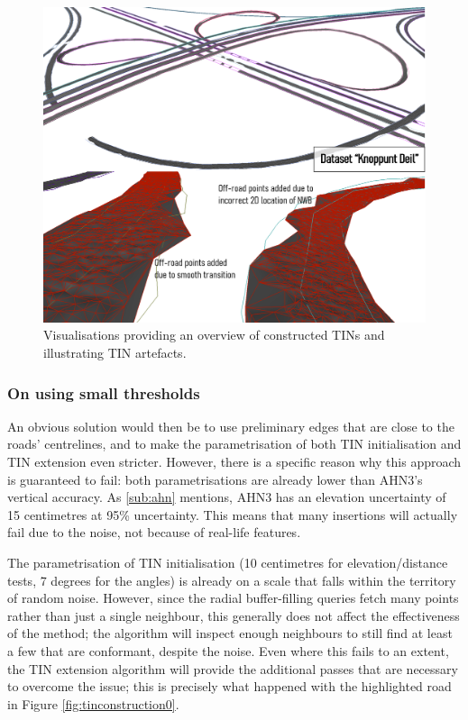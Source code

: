 \begin{figure}
    \centering
    \includegraphics[width=0.9\linewidth]{final_report/figs/tinconstruction1.png}
    \caption{Visualisations providing an overview of constructed TINs and illustrating TIN artefacts.}
    \label{fig:tinconstruction1}
\end{figure}

\subsubsection{On using small thresholds}

An obvious solution would then be to use preliminary edges that are close to the roads' centrelines, and to make the parametrisation of both TIN initialisation and TIN extension even stricter. However, there is a specific reason why this approach is guaranteed to fail: both parametrisations are already lower than AHN3's vertical accuracy. As \ref{sub:ahn} mentions, AHN3 has an elevation uncertainty of 15 centimetres at 95\% uncertainty. This means that many insertions will actually fail due to the noise, not because of real-life features.

The parametrisation of TIN initialisation (10 centimetres for elevation/distance tests, 7 degrees for the angles) is already on a scale that falls within the territory of random noise. However, since the radial buffer-filling queries fetch many points rather than just a single neighbour, this generally does not affect the effectiveness of the method; the algorithm will inspect enough neighbours to still find at least a few that are conformant, despite the noise. Even where this fails to an extent, the TIN extension algorithm will provide the additional passes that are necessary to overcome the issue; this is precisely what happened with the highlighted road in Figure \ref{fig:tinconstruction0}.

